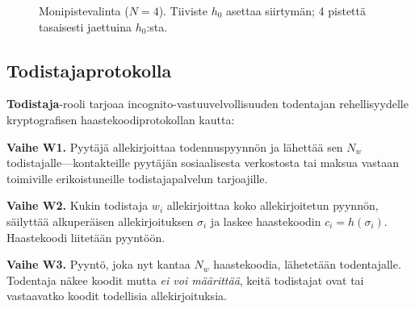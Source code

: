 \documentclass[11pt,a4paper,twocolumn]{article}
\begin{document}
\begin{figure}[ht]
\centering
{}
\caption{Monipistevalinta ($N{=}4$). Tiiviste $h_0$ asettaa siirtymän; 4 pistettä tasaisesti jaettuina $h_0$:sta.}
\label{fig:multipoint}
\end{figure}

\subsection{Todistajaprotokolla}

\textbf{Todistaja}-rooli tarjoaa incognito-vastuuvelvollisuuden todentajan rehellisyydelle kryptografisen haastekoodiprotokollan kautta:

\textbf{Vaihe W1.} Pyytäjä allekirjoittaa todennuspyynnön ja lähettää sen $N_w$ todistajalle---kontakteille pyytäjän sosiaalisesta verkostosta tai maksua vastaan toimiville erikoistuneille todistajapalvelun tarjoajille.

\textbf{Vaihe W2.} Kukin todistaja $w_i$ allekirjoittaa koko allekirjoitetun pyynnön, säilyttää alkuperäisen allekirjoituksen $\sigma_i$ ja laskee haastekoodin $c_i = h(\sigma_i)$. Haastekoodi liitetään pyyntöön.

\textbf{Vaihe W3.} Pyyntö, joka nyt kantaa $N_w$ haastekoodia, lähetetään todentajalle. Todentaja näkee koodit mutta \emph{ei voi määrittää}, keitä todistajat ovat tai vastaavatko koodit todellisia allekirjoituksia.
\end{document}
